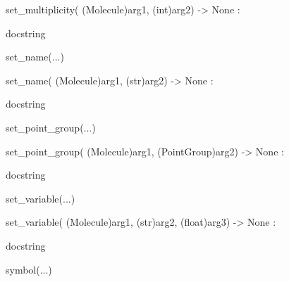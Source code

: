 \documentclass[letterpaper,10pt,english]{sphinxmanual}
\begin{document}
\begin{description}
\begin{description}
\begin{DUlineblock}{0em}
\begin{DUlineblock}{\DUlineblockindent}
\item[] set\_multiplicity( (Molecule)arg1, (int)arg2) -\textgreater{} None :
\item[]
\begin{DUlineblock}{\DUlineblockindent}
\item[] docstring
\item[] 
\end{DUlineblock}
\end{DUlineblock}
\item[] set\_name(...)
\item[]
\begin{DUlineblock}{\DUlineblockindent}
\item[] set\_name( (Molecule)arg1, (str)arg2) -\textgreater{} None :
\item[]
\begin{DUlineblock}{\DUlineblockindent}
\item[] docstring
\item[] 
\end{DUlineblock}
\end{DUlineblock}
\item[] set\_point\_group(...)
\item[]
\begin{DUlineblock}{\DUlineblockindent}
\item[] set\_point\_group( (Molecule)arg1, (PointGroup)arg2) -\textgreater{} None :
\item[]
\begin{DUlineblock}{\DUlineblockindent}
\item[] docstring
\item[] 
\end{DUlineblock}
\end{DUlineblock}
\item[] set\_variable(...)
\item[]
\begin{DUlineblock}{\DUlineblockindent}
\item[] set\_variable( (Molecule)arg1, (str)arg2, (float)arg3) -\textgreater{} None :
\item[]
\begin{DUlineblock}{\DUlineblockindent}
\item[] docstring
\item[] 
\end{DUlineblock}
\end{DUlineblock}
\item[] symbol(...)

\end{DUlineblock}
\end{description}
\end{description}
\end{document}
